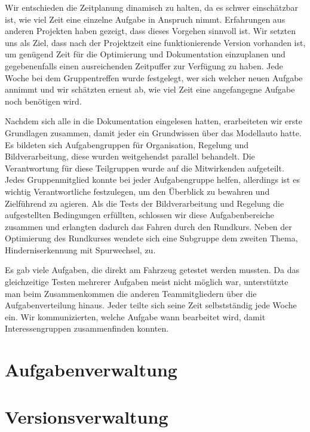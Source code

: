 Wir entschieden die Zeitplanung dinamisch zu halten, da es schwer einschätzbar ist, wie viel Zeit eine einzelne Aufgabe in Anspruch nimmt. Erfahrungen aus anderen Projekten haben gezeigt, dass dieses Vorgehen sinnvoll ist. Wir setzten uns als Ziel, dass nach  der Projektzeit eine funktionierende Version vorhanden ist, um genügend Zeit für die Optimierung und Dokumentation einzuplanen und gegebenenfalls einen ausreichenden Zeitpuffer zur Verfügung zu haben. Jede Woche bei dem Gruppentreffen wurde festgelegt, wer sich welcher neuen Aufgabe annimmt und wir schätzten erneut ab, wie viel Zeit eine angefangegne Aufgabe noch benötigen wird.


Nachdem sich alle in die Dokumentation eingelesen hatten, erarbeiteten wir erste Grundlagen zusammen, damit jeder ein Grundwissen über das Modellauto hatte. Es bildeten sich Aufgabengruppen für Organisation, Regelung und Bildverarbeitung, diese wurden weitgehendst parallel behandelt. Die Verantwortung für diese Teilgruppen wurde auf die Mitwirkenden aufgeteilt. Jedes Gruppenmitglied konnte bei jeder Aufgabengruppe helfen, allerdings ist es wichtig Verantwortliche festzulegen, um den Überblick zu bewahren und Zielführend zu agieren. Als die Tests der Bildverarbeitung und Regelung die aufgestellten Bedingungen erfüllten, schlossen wir diese Aufgabenbereiche zusammen und erlangten dadurch das Fahren durch den Rundkurs. Neben der Optimierung des Rundkurses wendete sich eine Subgruppe dem zweiten Thema, Hinderniserkennung mit Spurwechsel, zu.

Es gab viele Aufgaben, die direkt am Fahrzeug getestet werden mussten. Da das gleichzeitige Testen mehrerer Aufgaben meist nicht möglich war, unterstützte man beim Zusammenkommen die anderen Teammitgliedern über die Aufgabenverteilung hinaus. Jeder teilte sich seine Zeit selbstständig jede Woche ein. Wir kommunizierten, welche Aufgabe wann bearbeitet wird, damit Interessengruppen zusammenfinden konnten. 

\section{Aufgabenverwaltung}
\label{sec:aufgabenverwaltung}


\section{Versionsverwaltung}
\label{sec:versionsverwaltung}
